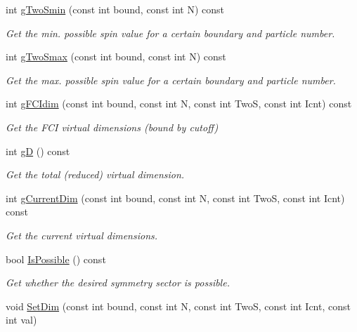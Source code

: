 \begin{DoxyCompactItemize}
int \hyperlink{classCheMPS2_1_1SyBookkeeper_aa1a9f3397c15a44e10035f22161fc825}{g\-Two\-Smin} (const int bound, const int N) const 
\begin{DoxyCompactList}\small\item\em Get the min. possible spin value for a certain boundary and particle number. \end{DoxyCompactList}\item 
int \hyperlink{classCheMPS2_1_1SyBookkeeper_a5203e4ac44a9c369974d9f817f634ddb}{g\-Two\-Smax} (const int bound, const int N) const 
\begin{DoxyCompactList}\small\item\em Get the max. possible spin value for a certain boundary and particle number. \end{DoxyCompactList}\item 
int \hyperlink{classCheMPS2_1_1SyBookkeeper_a6f5e333529c89f6f5f2ce2f11e082c49}{g\-F\-C\-Idim} (const int bound, const int N, const int Two\-S, const int Icnt) const 
\begin{DoxyCompactList}\small\item\em Get the F\-C\-I virtual dimensions (bound by cutoff) \end{DoxyCompactList}\item 
int \hyperlink{classCheMPS2_1_1SyBookkeeper_a44ff8a4f047febaab0674a239c982715}{g\-D} () const 
\begin{DoxyCompactList}\small\item\em Get the total (reduced) virtual dimension. \end{DoxyCompactList}\item 
int \hyperlink{classCheMPS2_1_1SyBookkeeper_ab9e13e1079e56b1ee12d4ed82b8c7d82}{g\-Current\-Dim} (const int bound, const int N, const int Two\-S, const int Icnt) const 
\begin{DoxyCompactList}\small\item\em Get the current virtual dimensions. \end{DoxyCompactList}\item 
bool \hyperlink{classCheMPS2_1_1SyBookkeeper_ae6bcbf2398cda17b45c02af73a02fc65}{Is\-Possible} () const 
\begin{DoxyCompactList}\small\item\em Get whether the desired symmetry sector is possible. \end{DoxyCompactList}\item 
void \hyperlink{classCheMPS2_1_1SyBookkeeper_ab496351a4cbc31f88be340d987d11406}{Set\-Dim} (const int bound, const int N, const int Two\-S, const int Icnt, const int val)

\end{DoxyCompactItemize}
